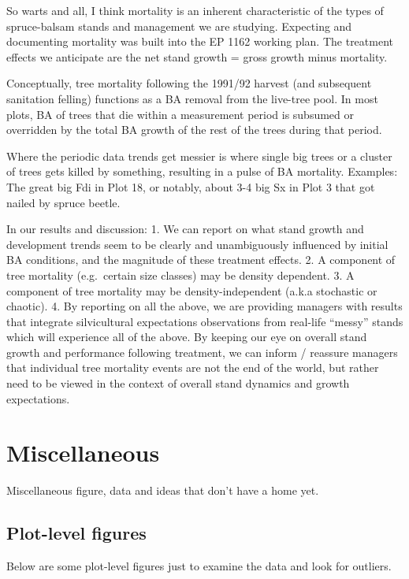 \documentclass[
]{article}
\begin{document}
So warts and all, I think mortality is an inherent characteristic of the types of spruce-balsam stands and management we are studying. Expecting and documenting mortality was built into the EP 1162 working plan. The treatment effects we anticipate are the net stand growth = gross growth minus mortality.

Conceptually, tree mortality following the 1991/92 harvest (and subsequent sanitation felling) functions as a BA removal from the live-tree pool. In most plots, BA of trees that die within a measurement period is subsumed or overridden by the total BA growth of the rest of the trees during that period.

Where the periodic data trends get messier is where single big trees or a cluster of trees gets killed by something, resulting in a pulse of BA mortality. Examples: The great big Fdi in Plot 18, or notably, about 3-4 big Sx in Plot 3 that got nailed by spruce beetle.

In our results and discussion:
1. We can report on what stand growth and development trends seem to be clearly and unambiguously influenced by initial BA conditions, and the magnitude of these treatment effects.
2. A component of tree mortality (e.g.~certain size classes) may be density dependent.
3. A component of tree mortality may be density-independent (a.k.a stochastic or chaotic).
4. By reporting on all the above, we are providing managers with results that integrate silvicultural expectations observations from real-life ``messy'' stands which will experience all of the above. By keeping our eye on overall stand growth and performance following treatment, we can inform / reassure managers that individual tree mortality events are not the end of the world, but rather need to be viewed in the context of overall stand dynamics and growth expectations.

\hypertarget{miscellaneous}{%
\section{Miscellaneous}\label{miscellaneous}}

Miscellaneous figure, data and ideas that don't have a home yet.

\hypertarget{plot-level-figures}{%
\subsection{Plot-level figures}\label{plot-level-figures}}

Below are some plot-level figures just to examine the data and look for outliers.
\end{document}
